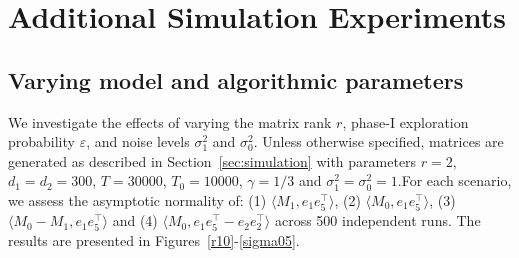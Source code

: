 \documentclass[12pt]{article}
\newcommand{\inp}[2]{\langle #1,#2\rangle}
\theoremstyle{plain}
\begin{document}
\section{Additional Simulation Experiments}\label{app:numerical}

\subsection{Varying model and algorithmic parameters}
We investigate the effects of varying the matrix rank $r$, phase-I exploration probability $\varepsilon$, and noise levels $\sigma_1^2$ and $\sigma_0^2$. Unless otherwise specified, matrices are generated as described in Section~\ref{sec:simulation} with parameters $r=2$, $d_1=d_2=300$, $T=30000$, $T_0=10000$, $\gamma=1/3$ and $\sigma_1^2=\sigma_0^2=1$.For each scenario, we assess the asymptotic normality of: (1) $\inp{M_1}{e_1e_5^{\top}}$, (2) $\inp{M_0}{e_1e_5^{\top}}$, (3)$\inp{M_0-M_1}{e_1e_5^{\top}}$ and (4) $\inp{M_0}{e_1e_5^{\top} - e_2e_2^{\top}}$ across 500 independent runs. The results are presented in Figures~\ref{r10}-\ref{sigma05}.
\end{document}
